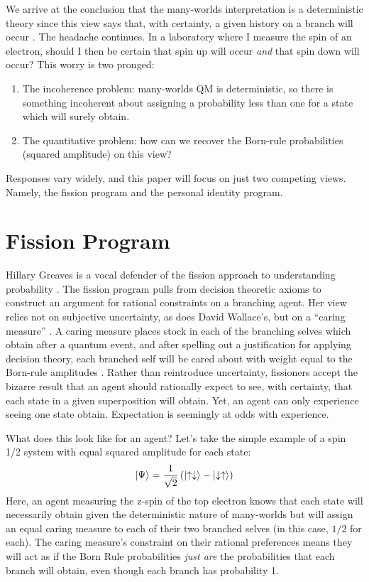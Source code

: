 \documentclass{article}
\begin{document}
We arrive at the conclusion that the many-worlds interpretation is a deterministic theory since this view says that, with certainty, a given history on a branch will occur \parencite{albertProbabilityEverettPicture2010}. The headache continues. In a laboratory where I measure the spin of an electron, should I then be certain that spin up will occur \emph{and} that spin down will occur? This worry is two pronged:
\begin{enumerate}
\item The incoherence problem: many-worlds QM is deterministic, so there is something incoherent about assigning a probability less than one for a state which will surely obtain.
\item The quantitative problem: how can we recover the Born-rule probabilities (squared amplitude) on this view?
\end{enumerate}
Responses vary widely, and this paper will focus on just two competing views. Namely, the fission program and the personal identity program.

\section{Fission Program}

Hillary Greaves is a vocal defender of the fission approach to understanding probability \parencite{greavesEverettEvidence2010, greavesProbabilityEverettInterpretation2007, greavesUnderstandingDeutschsProbability2004}. The fission program pulls from decision theoretic axioms to construct an argument for rational constraints on a branching agent. Her view relies not on subjective uncertainty, as does David Wallace's, but on a ``caring measure'' \parencite{wallaceEpistemologyQuantizedCircumstances2006}. A caring measure places stock in each of the branching selves which obtain after a quantum event, and after spelling out a justification for applying decision theory, each branched self will be cared about with weight equal to the Born-rule amplitudes \parencite[sec. 3.1.2]{greavesProbabilityEverettInterpretation2007}. Rather than reintroduce uncertainty, fissioners accept the bizarre result that an agent should rationally expect to see, with certainty, that each state in a given superposition will obtain. Yet, an agent can only experience seeing one state obtain. Expectation is seemingly at odds with experience.

What does this look like for an agent? Let’s take the simple example of a spin 1/2 system with equal squared amplitude for each state:
\begin{gather}
  \ket{\Psi} = \frac{1}{\sqrt{2}}\left(\ket{\uparrow\downarrow} - \ket{\downarrow\uparrow}\right)
\end{gather}
Here, an agent measuring the z-spin of the top electron knows that each state will necessarily obtain given the deterministic nature of many-worlds but will assign an equal caring measure to each of their two branched selves (in this case, $1/2$ for each). The caring measure’s constraint on their rational preferences means they will act as if the Born Rule probabilities \emph{just are} the probabilities that each branch will obtain, even though each branch has probability 1.
\end{document}
